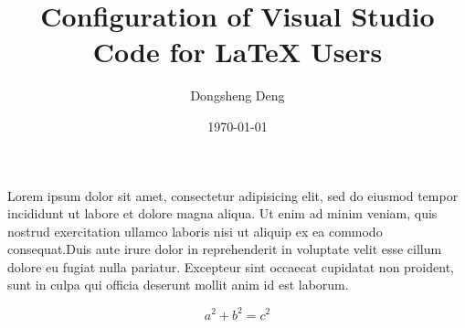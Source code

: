 \documentclass{article}
\author{Dongsheng Deng}
\title{Configuration of Visual Studio Code for \LaTeX{} Users}
\date{\today}
\begin{document}
\maketitle

Lorem ipsum dolor sit amet, consectetur adipisicing elit, sed do eiusmod
tempor incididunt ut labore et dolore magna aliqua. Ut enim ad minim veniam,
quis nostrud exercitation ullamco laboris nisi ut aliquip ex ea commodo
consequat.Duis aute irure dolor in reprehenderit in voluptate velit esse
cillum dolore eu fugiat nulla pariatur. Excepteur sint occaecat cupidatat non
proident, \cite{GraffZivin2018} sunt in culpa qui officia deserunt mollit anim id est laborum.

\begin{equation}
  a^2+b^2=c^2
\end{equation}



\end{document}

